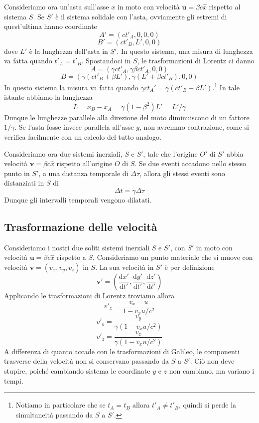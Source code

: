 \documentclass[a4paper,11pt]{book}
\newcommand{\dif}{\mathrm{d}}
\renewcommand{\vec}[1]{\mathbf{#1}}
\theoremstyle{theorem}
\theoremstyle{definition}
\begin{document}
\noindent Consideriamo ora un'asta sull'asse $x$ in moto con velocità $\vec{u}=\beta c\hat{x}$ rispetto al sistema $S$. Se $S'$ è il sistema solidale con l'asta, ovviamente gli estremi di quest'ultima hanno coordinate
\[A'=(ct'_A,0,0,0)\]
\[B'=(ct'_B,L',0,0)\]
dove $L'$ è la lunghezza dell'asta in $S'$. In questo sistema, una misura di lunghezza va fatta quando $t'_A=t'_B$. Spostandoci in $S$, le trasformazioni di Lorentz ci danno
\[A=(\gamma ct'_A,\gamma\beta ct'_A,0,0)\]
\[B=(\gamma(ct'_B+\beta L'),\gamma(L'+\beta ct'_B),0,0)\]
In questo sistema la misura va fatta quando $\gamma ct_A'=\gamma(ct'_B+\beta L')$.\footnote{Notiamo in particolare che se $t_A=t_B$ allora $t'_A\neq t'_B$, quindi si perde la simultaneità passando da $S$ a $S'$.} In tale istante abbiamo la lunghezza
\[L=x_B-x_A=\gamma(1-\beta^2)L'=L'/\gamma\]
Dunque le lunghezze parallele alla direzione del moto diminuiscono di un fattore $1/\gamma$. Se l'asta fosse invece parallela all'asse $y$, non avremmo contrazione, come si verifica facilmente con un calcolo del tutto analogo.

\noindent Consideriamo ora due sistemi inerziali, $S$ e $S'$, tale che l'origine $O'$ di $S'$ abbia velocità $\vec{v}=\beta c\hat{x}$ rispetto all'origine $O$ di $S$. Se due eventi accadono nello stesso punto in $S'$, a una distanza temporale di $\Delta\tau$, allora gli stessi eventi sono distanziati in $S$ di
\[\Delta t=\gamma\Delta\tau\]
Dunque gli intervalli temporali vengono dilatati.
\subsection{Trasformazione delle velocità}
Consideriamo i nostri due soliti sistemi inerziali $S$ e $S'$, con $S'$ in moto con velocità $\vec{u}=\beta c\hat{x}$ rispetto a $S$. Consideriamo un punto materiale che si muove con velocità $\vec{v}=(v_x,v_y,v_z)$ in $S$. La sua velocità in $S'$ è per definizione
\[\vec{v}'=\left(\frac{\dif x'}{\dif t'},\frac{\dif y'}{\dif t'},\frac{\dif z'}{\dif t'}\right)\]
Applicando le trasformazioni di Lorentz troviamo allora
\[v'_x=\frac{v_x-u}{1-v_xu/c^2}\]
\[v'_y=\frac{v_y}{\gamma(1-v_xu/c^2)}\]
\[v'_z=\frac{v_z}{\gamma(1-v_xu/c^2)}\]
A differenza di quanto accade con le trasformazioni di Galileo, le componenti trasverse della velocità non si conservano passando da $S$ a $S'$. Ciò non deve stupire, poiché cambiando sistema le coordinate $y$ e $z$ non cambiano, ma variano i tempi.
\end{document}
